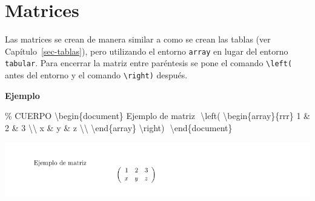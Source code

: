 \documentclass[
  a4paper,
]{scrreport}
\newenvironment{Shaded}{\begin{snugshade}}{\end{snugshade}}
\newcommand{\CommentTok}[1]{\textcolor[rgb]{0.37,0.37,0.37}{#1}}
\newcommand{\ExtensionTok}[1]{\textcolor[rgb]{0.00,0.23,0.31}{#1}}
\newcommand{\KeywordTok}[1]{\textcolor[rgb]{0.00,0.23,0.31}{#1}}
\newcommand{\NormalTok}[1]{\textcolor[rgb]{0.00,0.23,0.31}{#1}}
\newcommand{\SpecialCharTok}[1]{\textcolor[rgb]{0.37,0.37,0.37}{#1}}
\newcommand{\SpecialStringTok}[1]{\textcolor[rgb]{0.13,0.47,0.30}{#1}}
\begin{document}
\hypertarget{matrices}{%
\section{Matrices}\label{matrices}}

Las matrices se crean de manera similar a como se crean las tablas (ver
Capítulo~\ref{sec-tablas}), pero utilizando el entorno \texttt{array} en
lugar del entorno \texttt{tabular}. Para encerrar la matriz entre
paréntesis se pone el comando \texttt{\textbackslash{}left(} antes del
entorno y el comando \texttt{\textbackslash{}right)} después.

\textbf{Ejemplo}

\begin{Shaded}
\begin{Highlighting}[]
\CommentTok{\% CUERPO}
\KeywordTok{\textbackslash{}begin}\NormalTok{\{}\ExtensionTok{document}\NormalTok{\}}
\NormalTok{Ejemplo de matriz}
\SpecialStringTok{$$}
\SpecialCharTok{\textbackslash{}left}\SpecialStringTok{(}
\KeywordTok{\textbackslash{}begin}\NormalTok{\{}\ExtensionTok{array}\NormalTok{\}}\SpecialStringTok{\{rrr\}}
\SpecialStringTok{1 \& 2 \& 3 }\SpecialCharTok{\textbackslash{}\textbackslash{}}
\SpecialStringTok{x \& y \& z }\SpecialCharTok{\textbackslash{}\textbackslash{}}
\KeywordTok{\textbackslash{}end}\NormalTok{\{}\ExtensionTok{array}\NormalTok{\}}
\SpecialCharTok{\textbackslash{}right}\SpecialStringTok{)}
\SpecialStringTok{$$}
\KeywordTok{\textbackslash{}end}\NormalTok{\{}\ExtensionTok{document}\NormalTok{\}}
\end{Highlighting}
\end{Shaded}

\begin{tcolorbox}[enhanced jigsaw, bottomrule=.15mm, leftrule=.75mm, opacityback=0, titlerule=0mm, bottomtitle=1mm, colbacktitle=quarto-callout-note-color!10!white, arc=.35mm, toprule=.15mm, colframe=quarto-callout-note-color-frame, title={Salida}, coltitle=black, colback=white, breakable, toptitle=1mm, rightrule=.15mm, left=2mm, opacitybacktitle=0.6]

\includegraphics{./img/formulas/matriz.png}

\end{tcolorbox}
\end{document}
